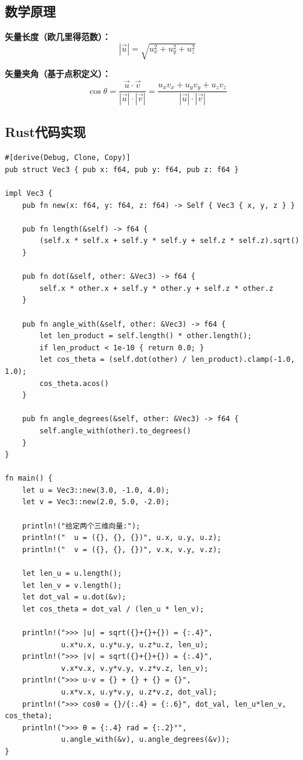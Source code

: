 \documentclass[12pt,a4paper]{article}
\begin{document}
\subsection{数学原理}
\textbf{矢量长度（欧几里得范数）：}
\[
|\vec{u}| = \sqrt{u_x^2 + u_y^2 + u_z^2}
\]

\textbf{矢量夹角（基于点积定义）：}
\[
\cos\theta = \frac{\vec{u} \cdot \vec{v}}{|\vec{u}| \cdot |\vec{v}|} = \frac{u_x v_x + u_y v_y + u_z v_z}{|\vec{u}| \cdot |\vec{v}|}
\]

\subsection{Rust代码实现}

\begin{lstlisting}
#[derive(Debug, Clone, Copy)]
pub struct Vec3 { pub x: f64, pub y: f64, pub z: f64 }

impl Vec3 {
    pub fn new(x: f64, y: f64, z: f64) -> Self { Vec3 { x, y, z } }

    pub fn length(&self) -> f64 {
        (self.x * self.x + self.y * self.y + self.z * self.z).sqrt()
    }

    pub fn dot(&self, other: &Vec3) -> f64 {
        self.x * other.x + self.y * other.y + self.z * other.z
    }

    pub fn angle_with(&self, other: &Vec3) -> f64 {
        let len_product = self.length() * other.length();
        if len_product < 1e-10 { return 0.0; }
        let cos_theta = (self.dot(other) / len_product).clamp(-1.0, 1.0);
        cos_theta.acos()
    }

    pub fn angle_degrees(&self, other: &Vec3) -> f64 {
        self.angle_with(other).to_degrees()
    }
}

fn main() {
    let u = Vec3::new(3.0, -1.0, 4.0);
    let v = Vec3::new(2.0, 5.0, -2.0);

    println!("给定两个三维向量:");
    println!("  u = ({}, {}, {})", u.x, u.y, u.z);
    println!("  v = ({}, {}, {})", v.x, v.y, v.z);

    let len_u = u.length();
    let len_v = v.length();
    let dot_val = u.dot(&v);
    let cos_theta = dot_val / (len_u * len_v);

    println!(">>> |u| = sqrt({}+{}+{}) = {:.4}", 
             u.x*u.x, u.y*u.y, u.z*u.z, len_u);
    println!(">>> |v| = sqrt({}+{}+{}) = {:.4}", 
             v.x*v.x, v.y*v.y, v.z*v.z, len_v);
    println!(">>> u·v = {} + {} + {} = {}", 
             u.x*v.x, u.y*v.y, u.z*v.z, dot_val);
    println!(">>> cosθ = {}/{:.4} = {:.6}", dot_val, len_u*len_v, cos_theta);
    println!(">>> θ = {:.4} rad = {:.2}°", 
             u.angle_with(&v), u.angle_degrees(&v));
}
\end{lstlisting}
\end{document}
